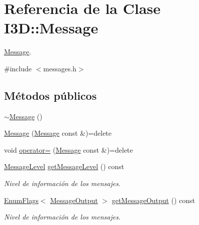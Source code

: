 \hypertarget{class_i3_d_1_1_message}{}\section{Referencia de la Clase I3D\+:\+:Message}
\label{class_i3_d_1_1_message}


\hyperlink{class_i3_d_1_1_message}{Message}.  




{\ttfamily \#include $<$messages.\+h$>$}

\subsection*{Métodos públicos}
\begin{DoxyCompactItemize}
\item 
\hyperlink{class_i3_d_1_1_message_a96370615d50060b3c7326da6374887ef}{$\sim$\+Message} ()
\item 
\hyperlink{class_i3_d_1_1_message_af1da7ef3a7ce40e79c298b1ebc9c2796}{Message} (\hyperlink{class_i3_d_1_1_message}{Message} const \&)=delete
\item 
void \hyperlink{class_i3_d_1_1_message_a7a757579a6966a8a80aeac7529a34b4b}{operator=} (\hyperlink{class_i3_d_1_1_message}{Message} const \&)=delete
\item 
\hyperlink{namespace_i3_d_a1c1740d2076e09b1a37b82e45a0327b5}{Message\+Level} \hyperlink{class_i3_d_1_1_message_aa5360e772b5fd6921bd4e8b3ec6925d8}{get\+Message\+Level} () const 
\begin{DoxyCompactList}\small\item\em Nivel de información de los mensajes. \end{DoxyCompactList}\item 
\hyperlink{class_i3_d_1_1_enum_flags}{Enum\+Flags}$<$ \hyperlink{namespace_i3_d_a2ccb65ac6e08844c1175a235107fa103}{Message\+Output} $>$ \hyperlink{class_i3_d_1_1_message_a9b6daa0dce23d8af3f774e9bcc1edc68}{get\+Message\+Output} () const 
\begin{DoxyCompactList}\small\item\em Nivel de información de los mensajes. \end{DoxyCompactList}\end{DoxyCompactItemize}
